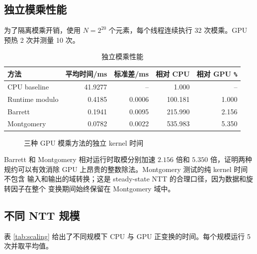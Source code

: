 ﻿\documentclass[a4paper]{article}
\begin{document}
\subsection{独立模乘性能}

为了隔离模乘开销，使用 $N=2^{20}$ 个元素，每个线程连续执行 32 次模乘。GPU
预热 2 次并测量 10 次。

\begin{table}[H]
  \centering
  \caption{独立模乘性能}
  \begin{tabular}{lrrrr}
    \toprule
    方法 & 平均时间/ms & 标准差/ms & 相对 CPU & 相对 GPU \texttt{\%} \\
    \midrule
    CPU baseline     & 41.9277 & --     & 1.000   & -- \\
    Runtime modulo   & 0.4185  & 0.0006 & 100.181 & 1.000 \\
    Barrett          & 0.1941  & 0.0095 & 215.990 & 2.156 \\
    Montgomery       & 0.0782  & 0.0022 & 535.983 & 5.350 \\
    \bottomrule
  \end{tabular}
\end{table}

\begin{figure}[H]
  \centering
  \caption{三种 GPU 模乘方法的独立 kernel 时间}
\end{figure}

Barrett 和 Montgomery 相对运行时取模分别加速 $2.156$ 倍和 $5.350$ 倍，证明两种
规约可以有效消除 GPU 上昂贵的整数除法。Montgomery 测试的纯 kernel 时间不包含
输入和输出的域转换；这是 steady-state NTT 的合理口径，因为数据和旋转因子在整个
变换期间始终保留在 Montgomery 域中。

\subsection{不同 NTT 规模}

表 \ref{tab:scaling} 给出了不同规模下 CPU 与 GPU 正变换的时间。每个规模运行
5 次并取平均值。
\end{document}
